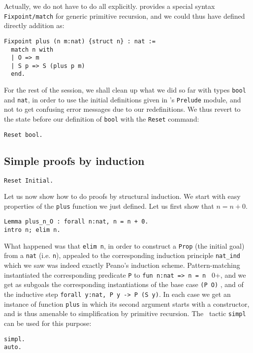 \documentclass{book}
\begin{document}
Actually, we do not have to do all explicitly. {\Coq} provides a
special syntax {\tt Fixpoint/match} for generic primitive recursion,
and we could thus have defined directly addition as:

\begin{lstlisting}
Fixpoint plus (n m:nat) {struct n} : nat :=
  match n with
  | O => m
  | S p => S (plus p m)
  end.
\end{lstlisting}

For the rest of the session, we shall clean up what we did so far with 
types \verb:bool: and \verb:nat:, in order to use the initial definitions
given in \Coq's \verb:Prelude: module, and not to get confusing error
messages due to our redefinitions. We thus revert to the state before
our definition of \verb:bool: with the \verb:Reset: command:
\begin{lstlisting}
Reset bool.
\end{lstlisting}


\subsection{Simple proofs by induction}

\begin{lstlisting}
Reset Initial.
\end{lstlisting}

Let us now show how to do proofs by structural induction. We start with easy
properties of the \verb:plus: function we just defined. Let us first
show that $n=n+0$.
\begin{lstlisting}
Lemma plus_n_O : forall n:nat, n = n + 0.
intro n; elim n.
\end{lstlisting}

What happened was that \verb:elim n:, in order to construct a \verb:Prop:
(the initial goal) from a \verb:nat: (i.e. \verb:n:), appealed to the
corresponding induction principle \verb:nat_ind: which we saw was indeed
exactly Peano's induction scheme. Pattern-matching instantiated the 
corresponding predicate \verb:P: to \verb+fun n:nat => n = n + 0+, and we get
as subgoals the corresponding instantiations of the base case \verb:(P O): ,
and of the inductive step \verb+forall y:nat, P y -> P (S y)+.
In each case we get an instance of function \verb:plus: in which its second
argument starts with a constructor, and is thus amenable to simplification
by primitive recursion. The \Coq~tactic \verb:simpl: can be used for
this purpose:
\begin{lstlisting}
simpl.
auto.
\end{lstlisting}
\end{document}
